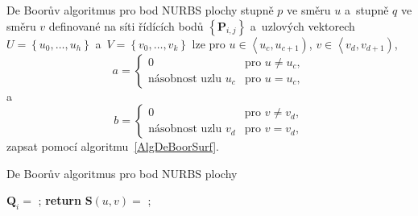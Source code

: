 De Boorův algoritmus pro bod NURBS plochy stupně $p$ ve směru $u$ a~stupně $q$ ve směru $v$ definované na síti řídících bodů $\left\lbrace \mathbf{P}_{i,j} \right\rbrace$ a~uzlových vektorech  $U=\left\lbrace u_0,\dots,u_h \right\rbrace $ a~$V=\left\lbrace v_0,\dots,v_k \right\rbrace $ lze pro $u\in\left\langle u_c, u_{c+1}\right)$, $v\in\left\langle v_d, v_{d+1}\right)$, 
\begin{equation*}
a=
\begin{cases}
0 & \text{pro $u\neq u_c$},\\
\text{násobnost uzlu $u_c$} & \text{pro $u=u_c$},
\end{cases}
\end{equation*}
a
\begin{equation*}
b=
\begin{cases}
0 & \text{pro $v\neq v_d$},\\
\text{násobnost uzlu $v_d$} & \text{pro $v=v_d$},
\end{cases}
\end{equation*}
zapsat pomocí algoritmu~\ref{AlgDeBoorSurf}.
\begin{center}
	\begin{algorithm}[H]
		\caption{De Boorův algoritmus pro bod NURBS plochy}
		\label{AlgDeBoorSurf}
		\begin{algorithmic}[1]
			\State $\mathbf{Q}_i=$ ;
			\EndFor
			\State \textbf{return} $\mathbf{S}\left(u,v\right)=$ ;
			\EndFunction
		\end{algorithmic}
	\end{algorithm}
	
	
\end{center}

